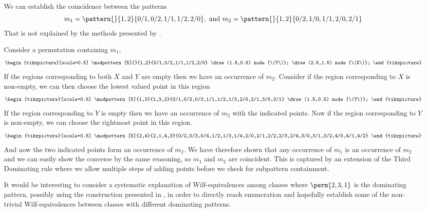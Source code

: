  \begin{example}
   We can establish the coincidence between the patterns
   \begin{equation*}
     m_1 = \pattern{}{1,2}{0/1,0/2,1/1,1/2,2/0}, \text{ and } m_2 = \pattern{}{1,2}{0/2,1/0,1/1,2/0,2/1}
   \end{equation*}
   That is not explained by the methods presented by \textcite{DBLP:journals/corr/ClaessonTU14}.

   Consider a permutation containing \(m_1\),
   \begin{equation*}
     \begin{tikzpicture}[scale=0.5]
         \modpattern[5]{}{1,2}{0/1,0/2,1/1,1/2,2/0}
         \draw (1.5,0.5) node {\(Y\)};
         \draw (2.5,1.5) node {\(X\)};
     \end{tikzpicture}
   \end{equation*}
   If the regions corresponding to both \(X\) and \(Y\) are empty then we have
   an occurrence of \(m_2\).
   Consider if the region corresponding to \(X\) is non-empty, we can then choose
   the lowest valued point in this region
   \begin{equation*}
     \begin{tikzpicture}[scale=0.5]
         \modpattern[5]{1,3}{1,3,2}{0/1,0/2,0/3,1/1,1/2,1/3,2/0,2/1,3/0,3/1}
         \draw (1.5,0.5) node {\(Y\)};
     \end{tikzpicture}
   \end{equation*}
   If the region corresponding to \(Y\) is empty then we have an occurrence of
   \(m_2\) with the indicated points.
   Now if the region corresponding to \(Y\) is non-empty, we can choose the
   rightmost point in this region.
   \begin{equation*}
     \begin{tikzpicture}[scale=0.5]
         \modpattern[5]{2,4}{2,1,4,3}{0/2,0/3,0/4,1/2,1/3,1/4,2/0,2/1,2/2,2/3,2/4,3/0,3/1,3/2,4/0,4/1,4/2}
     \end{tikzpicture}
   \end{equation*}
   And now the two indicated points form an occurrence of \(m_2\).
   We have therefore shown that any occurrence of \(m_1\) is an occurrence of
   \(m_2\) and we can easily show the converse by the same reasoning, so \(m_1\)
   and \(m_2\) are coincident.
   This is captured by an extension of the Third Dominating rule where we allow
   multiple steps of adding points before we check for subpattern containment.
 \end{example}

It would be interesting to consider a systematic explanation of Wilf-equivalences among classes
where \(\perm{2,3,1}\) is the dominating pattern, possibly using the  construction presented in
\cite[Sec.~12]{2015arXiv151203226B}, in order to directly reach enumeration and hopefully establish
some of the non-trivial Wilf-equivalences between classes with different dominating patterns.
